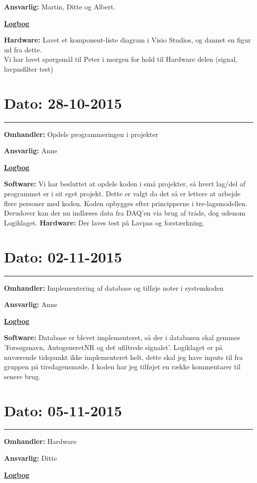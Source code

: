 \textbf{Ansvarlig:} Martin, Ditte og Albert.

\underline{\textbf{Logbog}}

\textbf{Hardware: } Lavet et komponent-liste diagram i Visio Studios, og dannet en figur ud fra dette. 
\\
Vi har lavet spørgsmål til Peter i morgen for hold til Hardware delen (signal, lavpasfilter test)

\newpage
\section{Dato: 28-10-2015}
\hrule
\textbf{Omhandler:} Opdele programmeringen i projekter

\textbf{Ansvarlig:} Anne

\underline{\textbf{Logbog}}

\textbf{Software: }Vi har besluttet at opdele koden i små projekter, så hvert lag/del af programmet er i sit eget projekt. Dette er valgt da det så er lettere at arbejde flere personer med koden. Koden opbygges efter principperne i tre-lagsmodellen. Derudover kan der nu indlæses data fra DAQ'en via brug af tråde, dog udenom Logiklaget. 
\textbf{Hardware: } Der laves test på Lavpas og forstærkning.  
\\

\section{Dato: 02-11-2015}
\hrule
\textbf{Omhandler:} Implementering af database og tilføje noter i systemkoden

\textbf{Ansvarlig:} Anne

\underline{\textbf{Logbog}}

\textbf{Software: }Database er blevet implementeret, så der i databasen skal gemmes 'Forsøgsnavn, AutogeneretNR og det ufiltrede signalet'. Logiklaget er på nuværende tidspunkt ikke implementeret helt, dette skal jeg have inputs til fra gruppen på tirsdagensmøde.  
I koden har jeg tilføjet en række kommentarer til senere brug.
\\

\section{Dato: 05-11-2015}
\hrule
\textbf{Omhandler:} Hardware

\textbf{Ansvarlig:} Ditte

\underline{\textbf{Logbog}}

